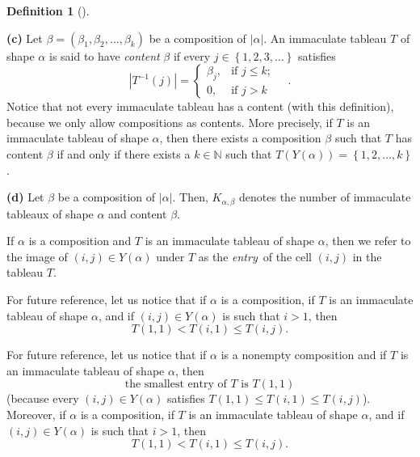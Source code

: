 \documentclass
[numbers=enddot,12pt,final,onecolumn,notitlepage,abstracton]{scrartcl}%
\theoremstyle{definition}
\newtheorem{defi}[theo]{Definition}
\newenvironment{definition}[1][]
{\begin{defi}[#1]\begin{leftbar}}
{\end{leftbar}\end{defi}}
\newenvironment{verlong}{}{}
\newenvironment{vershort}{}{}
\newenvironment{noncompile}{}{}
\begin{document}
\begin{definition}
\textbf{(c)} Let $\beta=\left(  \beta_{1},\beta_{2},\ldots,\beta_{k}\right)  $
be a composition of $\left\vert \alpha\right\vert $. An immaculate tableau $T$
of shape $\alpha$ is said to have \textit{content }$\beta$ if every
$j\in\left\{  1,2,3,\ldots\right\}  $ satisfies%
\[
\left\vert T^{-1}\left(  j\right)  \right\vert =
\begin{cases}
\beta_{j}, & \text{if }j\leq k;\\
0, & \text{if }j>k
\end{cases}
\quad.
\]
Notice that not every immaculate tableau has a content (with this definition),
because we only allow compositions as contents. More precisely, if $T$ is an
immaculate tableau of shape $\alpha$, then there exists a composition $\beta$
such that $T$ has content $\beta$ if and only if there exists a $k\in
\mathbb{N}$ such that $T\left(  Y\left(  \alpha\right)  \right)  =\left\{
1,2,\ldots,k\right\}  $.

\textbf{(d)} Let $\beta$ be a composition of $\left\vert \alpha\right\vert $.
Then, $K_{\alpha,\beta}$ denotes the number of immaculate tableaux of shape
$\alpha$ and content $\beta$.
\end{definition}

\begin{noncompile}
If $\alpha$ is a composition and $T$ is an immaculate tableau of shape
$\alpha$, then we refer to the image of $\left(  i,j\right)  \in Y\left(
\alpha\right)  $ under $T$ as the \textit{entry}\ of the cell $\left(
i,j\right)  $ in the tableau $T$.
\end{noncompile}

\begin{vershort}
For future reference, let us notice that if $\alpha$ is a composition, if $T$
is an immaculate tableau of shape $\alpha$, and if $\left(  i,j\right)  \in
Y\left(  \alpha\right)  $ is such that $i>1$, then%
\begin{equation}
T\left(  1,1\right)  <T\left(  i,1\right)  \leq T\left(  i,j\right)  .
\label{eq.immactab.min.2.short}%
\end{equation}

\end{vershort}

\begin{verlong}
For future reference, let us notice that if $\alpha$ is a nonempty composition
and if $T$ is an immaculate tableau of shape $\alpha$, then%
\begin{equation}
\text{the smallest entry of }T\text{ is }T\left(  1,1\right)
\label{eq.immactab.min}%
\end{equation}
(because every $\left(  i,j\right)  \in Y\left(  \alpha\right)  $ satisfies
$T\left(  1,1\right)  \leq T\left(  i,1\right)  \leq T\left(  i,j\right)  $).
Moreover, if $\alpha$ is a composition, if $T$ is an immaculate tableau of
shape $\alpha$, and if $\left(  i,j\right)  \in Y\left(  \alpha\right)  $ is
such that $i>1$, then%
\begin{equation}
T\left(  1,1\right)  <T\left(  i,1\right)  \leq T\left(  i,j\right)  .
\label{eq.immactab.min.2}%
\end{equation}

\end{verlong}
\end{document}
